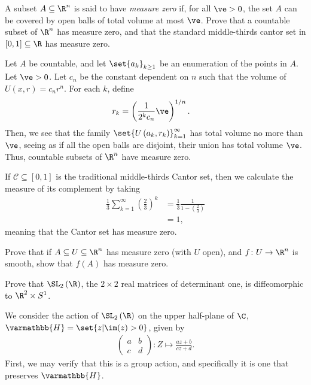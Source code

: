 \documentclass[10pt]{mypackage}
\renewcommand*{\mathbb}[1]{\varmathbb{#1}}
\begin{document}
\RaggedRight
\begin{problem}[Problem 1]
  A subset $A\subseteq \R^{n}$ is said to have \textit{measure zero} if, for all $\ve > 0$, the set $A$ can be covered by open balls of total volume at most $\ve$. Prove that a countable subset of $\R^{n}$ has measure zero, and that the standard middle-thirds cantor set in $[0,1]\subseteq \R$ has measure zero.
\end{problem}
\begin{solution}
  Let $A$ be countable, and let $\set{a_k}_{k\geq 1}$ be an enumeration of the points in $A$. Let $\ve > 0$. Let $c_{n}$ be the constant dependent on $n$ such that the volume of $U\left( x,r \right) = c_nr^{n}$. For each $k$, define
  \begin{align*}
    r_k &= \left( \frac{1}{2^{k}c_n} \ve \right)^{1/n}.
  \end{align*}
  Then, we see that the family $\set{U\left( a_k,r_k \right)}_{k=1}^{\infty}$ has total volume no more than $\ve$, seeing as if all the open balls are disjoint, their union has total volume $\ve$. Thus, countable subsets of $\R^{n}$ have measure zero.\newline

  If $\mathcal{C}\subseteq [0,1]$ is the traditional middle-thirds Cantor set, then we calculate the measure of its complement by taking
  \begin{align*}
    \frac{1}{3}\sum_{k=1}^{\infty} \left( \frac{2}{3} \right)^{k} &= \frac{1}{3} \frac{1}{1-\left( \frac{2}{3} \right)}\\
                                                                  &= 1,
  \end{align*}
  meaning that the Cantor set has measure zero.
\end{solution}
\begin{problem}[Problem 2]
  Prove that if $A\subseteq U\subseteq \R^{n}$ has measure zero (with $U$ open), and $f\colon U\rightarrow \R^{n}$ is smooth, show that $f(A)$ has measure zero.
\end{problem}
\begin{problem}[Problem 5]
  Prove that $\SL_2\left( \R \right)$, the $2\times 2$ real matrices of determinant one, is diffeomorphic to $\R^{2}\times S^{1}$.
\end{problem}
\begin{solution}
  We consider the action of $\SL_{2}\left( \R \right)$ on the upper half-plane of $\C$, $ \mathbb{H} = \set{z | \im(z) > 0} $, given by
  \begin{align*}
    \begin{pmatrix}a & b \\ c & d\end{pmatrix}\colon Z\mapsto \frac{az + b}{cz + d}.
  \end{align*}
  First, we may verify that this is a group action, and specifically it is one that preserves $ \mathbb{H} $.
\end{solution}
\end{document}
